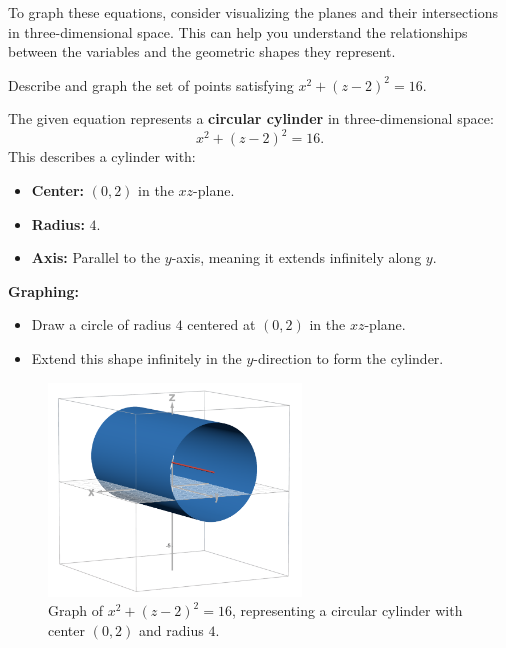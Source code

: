 \documentclass{article}
\begin{document}
\begin{tipbox}
To graph these equations, consider visualizing the planes and their intersections in three-dimensional space. This can help you understand the relationships between the variables and the geometric shapes they represent.
\end{tipbox}

\begin{examplebox}
    Describe and graph the set of points satisfying \(x^2 + (z - 2)^2 = 16\).

    \begin{solutionbox}
        The given equation represents a \textbf{circular cylinder} in three-dimensional space:
        \[
        x^2 + (z - 2)^2 = 16.
        \]
        This describes a cylinder with:
        \begin{itemize}
            \item \textbf{Center:} \((0,2)\) in the \( xz \)-plane.
            \item \textbf{Radius:} \(4\).
            \item \textbf{Axis:} Parallel to the \( y \)-axis, meaning it extends infinitely along \( y \).
        \end{itemize}

        \textbf{Graphing:}
        \begin{itemize}
            \item Draw a circle of radius \(4\) centered at \( (0,2) \) in the \( xz \)-plane.
            \item Extend this shape infinitely in the \( y \)-direction to form the cylinder.
        \end{itemize}

        \begin{figure}[H]
            \centering
            \includegraphics[width=0.6\textwidth]{x^2+(z-2)^2=16.png}
            \caption{Graph of \( x^2 + (z - 2)^2 = 16 \), representing a circular cylinder with center \((0,2)\) and radius \(4\).}
            \label{fig:circular_cylinder}
        \end{figure}
    \end{solutionbox}
\end{examplebox}
\end{document}
